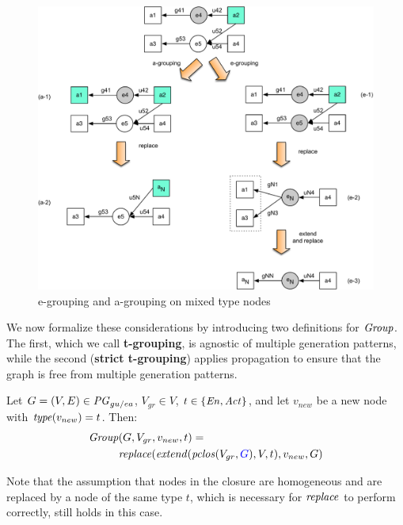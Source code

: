 \begin{figure}
\centering
\includegraphics[scale=.5]{figures/e2-a4.pdf} 
\caption{e-grouping and a-grouping on mixed type nodes} \label{fig:e2-a4}
\end{figure}

We now formalize these considerations by introducing two definitions for $\mathit{Group}$. The first, which we call \textbf{t-grouping}, is agnostic of multiple generation patterns, while the second (\textbf{strict t-grouping}) applies propagation to ensure that the graph is free from multiple generation patterns.

\vspace{10pt}
\begin{definition}[t-Grouping]
\label{def:t-grouping}
Let $G=(V,E) \in \mathit{PG}_{gu/ea}$, $V_{gr} \in V$, $t \in \{\mathit{En}, \mathit{Act}\}$, and let  $v_{new}$ be a new node with $\mathit{type}(v_{new}) = t$.
%
Then:
\begin{align*} 
\group & (G, V_{gr}, v_{new}, t) = \\
& \repl( \extend(\clos(V_{gr},\jwb{G}), V, t), v_{new},  G )
\end{align*}
\label{eq:t-grouping}
\end{definition}

Note that the assumption that  nodes in the closure are homogeneous and are replaced by a node of the same type $t$, which is necessary for $\mathit{replace}$ to perform correctly, still holds in this case. 

